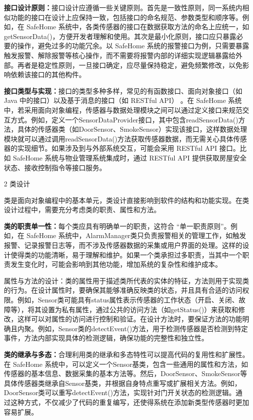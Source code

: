 \textbf{接口设计原则：}接口设计应遵循一些关键原则。首先是一致性原则，同一系统内相似功能的接口在设计上应保持一致，包括接口的命名规范、参数类型和顺序等。例如，在 SafeHome 系统中，各类传感器的接口在数据获取方法的命名上应统一，如getSensorData()，方便开发者理解和使用。其次是最小化原则，接口应只暴露必要的操作，避免过多的功能冗余。以 SafeHome 系统的报警接口为例，只需要暴露触发报警、解除报警等核心操作，而不需要将报警内部的详细实现逻辑暴露给外部。再者是稳定性原则，一旦接口确定，应尽量保持稳定，避免频繁修改，以免影响依赖该接口的其他构件。

\textbf{接口类型与实现：}接口的类型多种多样，常见的有函数接口、面向对象接口（如 Java 中的接口）以及基于消息的接口（如 RESTful API） 。在 SafeHome 系统中，若采用面向对象编程，传感器与数据处理模块之间可以通过定义接口来规范交互方式。例如，定义一个SensorDataProvider接口，其中包含readSensorData()方法，具体的传感器类（如DoorSensor、SmokeSensor）实现该接口，这样数据处理模块就可以通过调用readSensorData()方法获取传感器数据，而无需关心具体传感器的实现细节。如果涉及到与外部系统交互，可能会采用 RESTful API 接口。比如 SafeHome 系统与物业管理系统集成时，通过 RESTful API 提供获取房屋安全状态、接收控制指令等接口服务。

2 类设计

类是面向对象编程中的基本单元，类设计直接影响到软件的结构和功能实现。在类设计过程中，需要充分考虑类的职责、属性和方法。

\textbf{类的职责单一性：}每个类应具有明确单一的职责，这符合 ``单一职责原则''。例如，在 SafeHome 系统中，AlarmManager类只负责报警相关的管理工作，如触发报警、记录报警日志等，而不涉及传感器数据的采集或用户界面的处理。这样的设计使得类的功能清晰，易于理解和维护。如果一个类承担过多职责，当其中一个职责发生变化时，可能会影响到其他功能，增加系统的复杂性和维护成本。

属性与方法的设计：类的属性用于描述类所代表的实体的特征，方法则用于实现类的行为。在设计属性时，要确保其能够准确反映类的状态，并且具有合适的访问权限。例如，Sensor类可能具有status属性表示传感器的工作状态（开启、关闭、故障等），将其设置为私有属性，通过公共的访问方法（如getStatus()）来获取和修改，这样可以对属性的访问进行控制和验证。在设计方法时，要保证方法的功能明确且内聚。例如，Sensor类的detectEvent()方法，用于检测传感器是否检测到特定事件，方法内部实现具体的检测逻辑，确保功能的完整性和独立性。

\textbf{类的继承与多态：}合理利用类的继承和多态特性可以提高代码的复用性和扩展性。在 SafeHome 系统中，可以定义一个Sensor基类，包含一些通用的属性和方法，如传感器的基本信息、数据采集的基本方法等。然后，DoorSensor、SmokeSensor等具体传感器类继承自Sensor基类，并根据自身特点重写或扩展相关方法。例如，DoorSensor类可以重写detectEvent()方法，实现针对门开关状态的检测逻辑。通过这种方式，不仅减少了代码的重复编写，还使得系统在添加新类型传感器时更加容易扩展。

